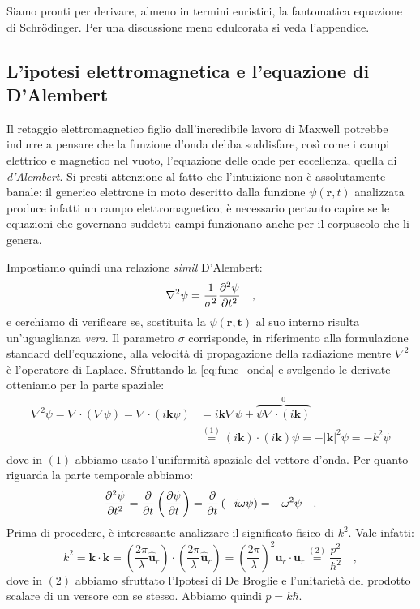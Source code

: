 Siamo pronti per derivare, almeno in termini euristici, la fantomatica equazione di Schrödinger. Per una discussione meno edulcorata si veda l'appendice. 

\subsection{L'ipotesi elettromagnetica e l'equazione di D'Alembert}
Il retaggio elettromagnetico figlio dall'incredibile lavoro di Maxwell potrebbe indurre a pensare che la funzione d'onda debba soddisfare, così come i campi elettrico e magnetico nel vuoto, l'equazione delle onde per eccellenza, quella di \emph{d'Alembert}. Si presti attenzione al fatto che l'intuizione non è assolutamente banale: il generico elettrone in moto descritto dalla funzione $\psi(\bm{r},t)$ analizzata produce infatti un campo elettromagnetico; è necessario pertanto capire se le equazioni che governano suddetti campi funzionano anche per il corpuscolo che li genera. 

Impostiamo quindi una relazione \emph{simil}  D'Alembert:
\begin{equation}
    \nabla^2 \psi = \frac{1}{\sigma^2} \pdv[2]{\psi}{t} \quad,
    \label{eq:d'ale}
\end{equation}
e cerchiamo di verificare se, sostituita la $\psi(\bm{r,t})$ al suo interno risulta un'uguaglianza \emph{vera}. Il parametro $\sigma$ corrisponde, in riferimento alla formulazione standard dell'equazione,  alla velocità di propagazione della radiazione mentre $\nabla^2$ è l'operatore di Laplace. Sfruttando la \eqref{eq:func_onda} e svolgendo le derivate otteniamo per la parte spaziale:
\[
\begin{aligned}
    \nabla^2 \psi = \nabla \cdot (\nabla\psi) = \nabla \cdot (i\bm{k}\psi) &= i\bm{k}\nabla\psi + \overbrace{\psi\nabla \cdot (i\bm{k})}^{0} \\ &\overset{(1)}{=} (i\bm{k})\cdot(i\bm{k})\psi = -|\bm{k}|^2 \psi = -k^2 \psi\\
\end{aligned}
\]
dove in $(1)$ abbiamo usato l'uniformità spaziale del vettore d'onda.
Per quanto riguarda la parte temporale abbiamo:
\[
    \pdv[2]{\psi}{t} = \pdv{}{t} \, \bigg(\pdv{\psi}{t}\bigg) = \pdv{}{t}\,(-i\omega\psi) = -\omega^2\psi \quad.
\]
Prima di procedere, è interessante analizzare il significato fisico di $k^2$. Vale infatti:
\[
    k^2 = \bm{k} \cdot \bm{k} = \left(\frac{2\pi}{\lambda} \bm{\hat{u}}_r\right) \cdot \left(\frac{2\pi}{\lambda} \bm{\hat{u}}_r\right) = \left(\frac{2\pi}{\lambda}\right)^2 \bm{u}_r \cdot \bm{u}_r \overset{(2)}{=} \frac{p^2}{\hbar^2}\quad,
\]
dove in $(2)$ abbiamo sfruttato l'Ipotesi di De Broglie e l'unitarietà del prodotto scalare di un versore con se stesso. Abbiamo quindi $p = k\hbar$. 

